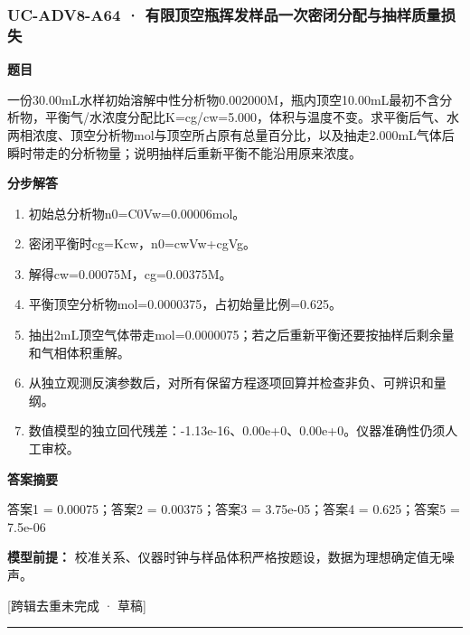 \documentclass[UTF8,11pt,a4paper]{ctexart}
\begin{document}
\subsubsection*{UC-ADV8-A64 · 有限顶空瓶挥发样品一次密闭分配与抽样质量损失}
\noindent\textbf{题目}\par
一份30.00mL水样初始溶解中性分析物0.002000M，瓶内顶空10.00mL最初不含分析物，平衡气/水浓度分配比K=cg/cw=5.000，体积与温度不变。求平衡后气、水两相浓度、顶空分析物mol与顶空所占原有总量百分比，以及抽走2.000mL气体后瞬时带走的分析物量；说明抽样后重新平衡不能沿用原来浓度。\par
\medskip\noindent\textbf{分步解答}
\begin{enumerate}
\item 初始总分析物n0=C0Vw=0.00006mol。
\item 密闭平衡时cg=Kcw，n0=cwVw+cgVg。
\item 解得cw=0.00075M，cg=0.00375M。
\item 平衡顶空分析物mol=0.0000375，占初始量比例=0.625。
\item 抽出2mL顶空气体带走mol=0.0000075；若之后重新平衡还要按抽样后剩余量和气相体积重解。
\item 从独立观测反演参数后，对所有保留方程逐项回算并检查非负、可辨识和量纲。
\item 数值模型的独立回代残差：-1.13e-16、0.00e+0、0.00e+0。仪器准确性仍须人工审校。
\end{enumerate}
\noindent\textbf{答案摘要}\par
答案1 = 0.00075；答案2 = 0.00375；答案3 = 3.75e-05；答案4 = 0.625；答案5 = 7.5e-06\par
\noindent\textbf{模型前提：}
校准关系、仪器时钟与样品体积严格按题设，数据为理想确定值无噪声。\par
\noindent\textcolor{red!65!black}{[跨辑去重未完成 · 草稿]} \par
\medskip\hrule\medskip
{}
\end{document}

